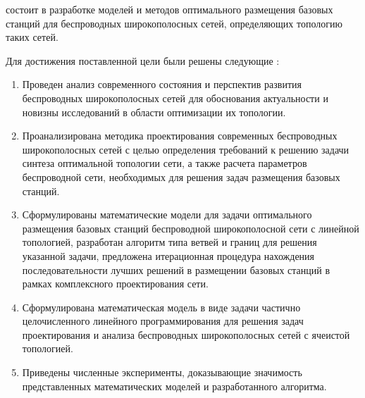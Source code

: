 {\aim} состоит в разработке моделей и методов оптимального размещения базовых станций для беспроводных широкополосных сетей, определяющих топологию таких сетей.

Для достижения поставленной цели были решены следующие {\tasks}:
\begin{enumerate}[beginpenalty=10000] %
  \item Проведен анализ современного состояния и перспектив развития беспроводных широкополосных сетей для обоснования  актуальности и новизны исследований в области оптимизации их топологии. 
  \item Проанализирована методика проектирования современных беспроводных широкополосных сетей с целью определения требований к решению задачи синтеза оптимальной топологии сети, а также расчета параметров беспроводной сети, необходимых для решения задач размещения базовых станций.
  \item Сформулированы математические модели для задачи оптимального размещения базовых станций беспроводной широкополосной сети с линейной топологией, разработан алгоритм типа ветвей и границ для решения указанной задачи, предложена итерационная процедура нахождения последовательности лучших решений в размещении базовых станций в рамках комплексного проектирования сети.
  \item Сформулирована математическая модель в виде задачи частично целочисленного линейного программирования для решения задач проектирования и анализа беспроводных широкополосных сетей с ячеистой топологией.
  \item Приведены численные эксперименты, доказывающие значимость представленных математических моделей и разработанного алгоритма.

\end{enumerate}

 

